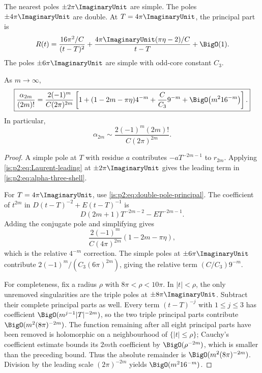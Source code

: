 The nearest poles $\pm2\pi\ImaginaryUnit$ are simple.  The poles $\pm4\pi\ImaginaryUnit$ are double.  At
$T=4\pi\ImaginaryUnit$, the principal part is
\begin{equation}
 R(t)=\frac{16\pi^2/C}{(t-T)^2}
 +\frac{4\pi\ImaginaryUnit(\pi\eta-2)/C}{t-T}+\BigO(1).
 \label{is:p2:eq:double-pole-principal}
\end{equation}
The poles $\pm6\pi\ImaginaryUnit$ are simple with odd-core constant $C_3$.

\begin{theorem}
\label{is:p2:thm:three-shell}
As $m\to\infty$,
\begin{equation}
 \boxed{
 \frac{\alpha_{2m}}{(2m)!}
 =\frac{2(-1)^m}{C(2\pi)^{2m}}
 \left[
 1+(1-2m-\pi\eta)4^{-m}
 +\frac{C}{C_3}9^{-m}
 +\BigO\!\left(m^2 16^{-m}\right)
 \right].
 }
 \label{is:p2:eq:alpha-three-shell}
\end{equation}
In particular,
\begin{equation}
 \alpha_{2m}
 \sim \frac{2(-1)^m(2m)!}{C(2\pi)^{2m}}.
 \label{is:p2:eq:alpha-leading-asymptotic}
\end{equation}
\end{theorem}

\begin{proof}
A simple pole at $T$ with residue $a$ contributes $-aT^{-2m-1}$ to $r_{2m}$.  Applying
\eqref{is:p2:eq:Laurent-leading} at $\pm2\pi\ImaginaryUnit$ gives the leading term in
\eqref{is:p2:eq:alpha-three-shell}.

For $T=4\pi\ImaginaryUnit$, use \eqref{is:p2:eq:double-pole-principal}.  The coefficient of $t^{2m}$ in
$D(t-T)^{-2}+E(t-T)^{-1}$ is
\[
 D(2m+1)T^{-2m-2}-ET^{-2m-1}.
\]
Adding the conjugate pole and simplifying gives
\[
 \frac{2(-1)^m}{C(4\pi)^{2m}}(1-2m-\pi\eta),
\]
which is the relative $4^{-m}$ correction.  The simple poles at $\pm6\pi\ImaginaryUnit$ contribute
$2(-1)^m/(C_3(6\pi)^{2m})$, giving the relative term $(C/C_3)9^{-m}$.

For completeness, fix a radius $\rho$ with $8\pi<\rho<10\pi$.  In
$|t|<\rho$, the only unremoved singularities are the triple poles at
$\pm8\pi\ImaginaryUnit$.  Subtract their complete principal parts as well.
Every term $(t-T)^{-j}$ with $1\le j\le3$ has coefficient
$\BigO(m^{j-1}|T|^{-2m})$, so the two triple principal parts contribute
$\BigO(m^2(8\pi)^{-2m})$.  The function remaining after all eight principal
parts have been removed is holomorphic on a neighbourhood of
$\{|t|\le\rho\}$; Cauchy's coefficient estimate bounds its $2m$th
coefficient by $\BigO(\rho^{-2m})$, which is smaller than the preceding
bound.  Thus the absolute remainder is
$\BigO(m^2(8\pi)^{-2m})$.  Division by the leading scale
$(2\pi)^{-2m}$ yields $\BigO(m^2 16^{-m})$.
\end{proof}

